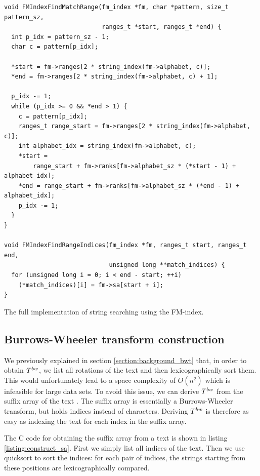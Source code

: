 \begin{listing}[H]
\begin{verbatim}
void FMIndexFindMatchRange(fm_index *fm, char *pattern, size_t pattern_sz,
                           ranges_t *start, ranges_t *end) {
  int p_idx = pattern_sz - 1;
  char c = pattern[p_idx];

  *start = fm->ranges[2 * string_index(fm->alphabet, c)];
  *end = fm->ranges[2 * string_index(fm->alphabet, c) + 1];

  p_idx -= 1;
  while (p_idx >= 0 && *end > 1) {
    c = pattern[p_idx];
    ranges_t range_start = fm->ranges[2 * string_index(fm->alphabet, c)];
    int alphabet_idx = string_index(fm->alphabet, c);
    *start =
        range_start + fm->ranks[fm->alphabet_sz * (*start - 1) + alphabet_idx];
    *end = range_start + fm->ranks[fm->alphabet_sz * (*end - 1) + alphabet_idx];
    p_idx -= 1;
  }
}

void FMIndexFindRangeIndices(fm_index *fm, ranges_t start, ranges_t end,
                             unsigned long **match_indices) {
  for (unsigned long i = 0; i < end - start; ++i)
    (*match_indices)[i] = fm->sa[start + i];
}
\end{verbatim}
\caption{The full implementation of string searching using the FM-index.}
\label{listing:string_searching}
\end{listing}

\subsection{Burrows-Wheeler transform construction} \label{section:bwt_construction}

We previously explained in section \ref{section:background_bwt} that, in order to obtain $T^{bw}$, we list all rotations of the text and then lexicographically sort them.
This would unfortunately lead to a space complexity of $O(n^2)$ which is infeasible for large data sets.
To avoid this issue, we can derive $T^{bw}$ from the suffix array of the text \cite{ullah_implementation_2020}.
The suffix array is essentially a Burrows-Wheeler transform, but holds indices instead of characters.
Deriving $T^{bw}$ is therefore as easy as indexing the text for each index in the suffix array.

The C code for obtaining the suffix array from a text is shown in listing \ref{listing:construct_sa}.
First we simply list all indices of the text.
Then we use quicksort to sort the indices: for each pair of indices, the strings starting from these positions are lexicographically compared.


